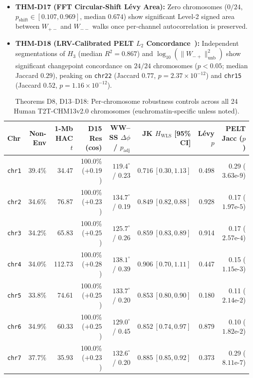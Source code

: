 \documentclass[11pt,a4paper]{article}
\newcommand{\Wpm}{W_{+-}}
\newcommand{\Wmp}{W_{-+}}
\newcommand{\Wmm}{W_{--}}
\newcommand{\Hthree}{H_3}
\begin{document}
\begin{itemize}
  \item \textbf{THM-D17 (FFT Circular-Shift L\'evy Area):} Zero chromosomes ($0/24$, $p_{\mathrm{shift}} \in [0.107, 0.969]$, median $0.674$) show significant Level-2 signed area between $\Wpm$ and $\Wmm$ walks once per-channel autocorrelation is preserved.
  \item \textbf{THM-D18 (LRV-Calibrated PELT $L_2$ Concordance~\cite{Killick2012,Zhang2007}):} Independent segmentations of $\Hthree$ (median $R^2=0.867$) and $\log_{10}(\|\Wmp\|^2_{\mathrm{unb}})$ show significant changepoint concordance on $24/24$ chromosomes ($p<0.05$; median Jaccard $0.29$), peaking on \texttt{chr22} (Jaccard $0.77$, $p=2.37\times 10^{-12}$) and \texttt{chr15} (Jaccard $0.52$, $p=1.16\times 10^{-12}$).
\end{itemize}

\begin{table}[htbp]
\centering
\caption{Theorems D8, D13--D18: Per-chromosome robustness controls across all 24 Human T2T-CHM13v2.0 chromosomes (euchromatin-specific unless noted).}
\label{tab:controls}
\scriptsize
\setlength{\tabcolsep}{3.0pt}
\begin{tabular}{@{}lrrrrrrr@{}}
\toprule
\textbf{Chr} & \textbf{Non-Env} & \textbf{1-Mb HAC $t$} & \textbf{D15 Res (cos)} & \textbf{WW--SS $\Delta\phi$ / $p_{\mathrm{adj}}$} & \textbf{JK $H_{\mathrm{WLS}}$ [95\% CI]} & \textbf{L\'evy $p$} & \textbf{PELT Jacc ($p$)} \\
\midrule
\texttt{chr1}  & 39.4\% &  34.47 & 100.0\% ($+0.19$) & $119.4^\circ$ / 0.23 & $0.716\ [0.30,1.13]$ & 0.498 & 0.29 ($3.63\text{e-}9$) \\
\texttt{chr2}  & 34.6\% &  76.87 & 100.0\% ($+0.23$) & $134.7^\circ$ / 0.19 & $0.849\ [0.82,0.88]$ & 0.928 & 0.17 ($1.97\text{e-}5$) \\
\texttt{chr3}  & 34.2\% &  65.83 & 100.0\% ($+0.25$) & $125.7^\circ$ / 0.26 & $0.859\ [0.83,0.89]$ & 0.914 & 0.17 ($2.57\text{e-}4$) \\
\texttt{chr4}  & 34.0\% & 112.73 & 100.0\% ($+0.28$) & $138.1^\circ$ / 0.39 & $0.906\ [0.70,1.11]$ & 0.447 & 0.15 ($1.15\text{e-}3$) \\
\texttt{chr5}  & 33.8\% &  74.61 & 100.0\% ($+0.25$) & $133.7^\circ$ / 0.20 & $0.853\ [0.80,0.90]$ & 0.180 & 0.11 ($2.14\text{e-}2$) \\
\texttt{chr6}  & 34.9\% &  60.33 & 100.0\% ($+0.25$) & $129.0^\circ$ / 0.45 & $0.852\ [0.74,0.97]$ & 0.879 & 0.10 ($1.82\text{e-}2$) \\
\texttt{chr7}  & 37.7\% &  35.93 & 100.0\% ($+0.23$) & $132.6^\circ$ / 0.20 & $0.885\ [0.85,0.92]$ & 0.373 & 0.29 ($8.11\text{e-}7$) \\

\end{tabular}
\end{table}
\end{document}

